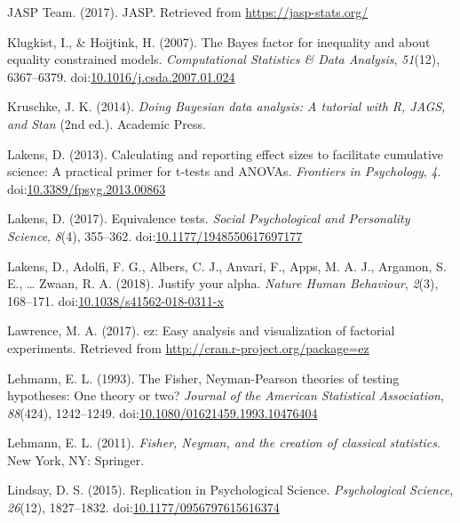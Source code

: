 \documentclass[english,man]{apa6}
\theoremstyle{definition}
\theoremstyle{definition}
\theoremstyle{definition}
\theoremstyle{remark}
\begin{document}
\hypertarget{ref-JASPTeam2017}{}
JASP Team. (2017). JASP. Retrieved from \url{https://jasp-stats.org/}

\hypertarget{ref-Klugkist2007}{}
Klugkist, I., \& Hoijtink, H. (2007). The Bayes factor for inequality
and about equality constrained models. \emph{Computational Statistics \&
Data Analysis}, \emph{51}(12), 6367--6379.
doi:\href{https://doi.org/10.1016/j.csda.2007.01.024}{10.1016/j.csda.2007.01.024}

\hypertarget{ref-Kruschke2014}{}
Kruschke, J. K. (2014). \emph{Doing Bayesian data analysis: A tutorial
with R, JAGS, and Stan} (2nd ed.). Academic Press.

\hypertarget{ref-Lakens2013}{}
Lakens, D. (2013). Calculating and reporting effect sizes to facilitate
cumulative science: A practical primer for t-tests and ANOVAs.
\emph{Frontiers in Psychology}, \emph{4}.
doi:\href{https://doi.org/10.3389/fpsyg.2013.00863}{10.3389/fpsyg.2013.00863}

\hypertarget{ref-Lakens2017a}{}
Lakens, D. (2017). Equivalence tests. \emph{Social Psychological and
Personality Science}, \emph{8}(4), 355--362.
doi:\href{https://doi.org/10.1177/1948550617697177}{10.1177/1948550617697177}

\hypertarget{ref-Lakens2017}{}
Lakens, D., Adolfi, F. G., Albers, C. J., Anvari, F., Apps, M. A. J.,
Argamon, S. E., \ldots{} Zwaan, R. A. (2018). Justify your alpha.
\emph{Nature Human Behaviour}, \emph{2}(3), 168--171.
doi:\href{https://doi.org/10.1038/s41562-018-0311-x}{10.1038/s41562-018-0311-x}

\hypertarget{ref-Lawrence2017}{}
Lawrence, M. A. (2017). ez: Easy analysis and visualization of factorial
experiments. Retrieved from \url{http://cran.r-project.org/package=ez}

\hypertarget{ref-Lehmann1993}{}
Lehmann, E. L. (1993). The Fisher, Neyman-Pearson theories of testing
hypotheses: One theory or two? \emph{Journal of the American Statistical
Association}, \emph{88}(424), 1242--1249.
doi:\href{https://doi.org/10.1080/01621459.1993.10476404}{10.1080/01621459.1993.10476404}

\hypertarget{ref-Lehmann2011}{}
Lehmann, E. L. (2011). \emph{Fisher, Neyman, and the creation of
classical statistics}. New York, NY: Springer.

\hypertarget{ref-Lindsay2015}{}
Lindsay, D. S. (2015). Replication in Psychological Science.
\emph{Psychological Science}, \emph{26}(12), 1827--1832.
doi:\href{https://doi.org/10.1177/0956797615616374}{10.1177/0956797615616374}
\end{document}
